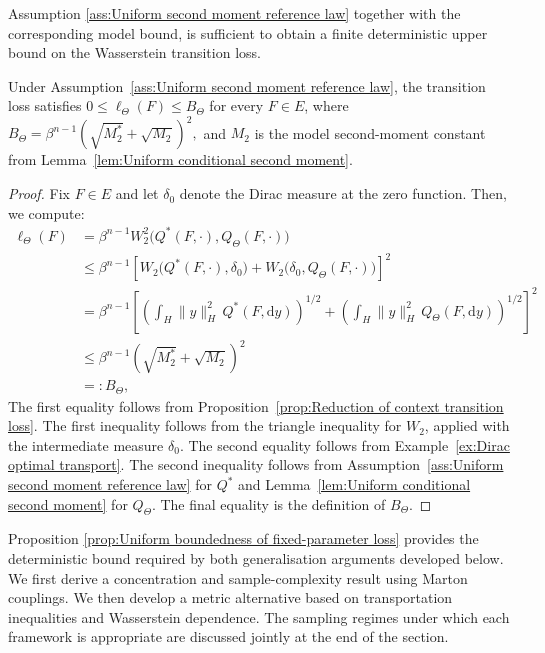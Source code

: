 Assumption \ref{ass:Uniform second moment reference law} together with the corresponding model bound, is sufficient to obtain a finite deterministic upper bound on the Wasserstein transition loss.

\begin{proposition}
\label{prop:Uniform boundedness of fixed-parameter loss}
Under Assumption~\ref{ass:Uniform second moment reference law}, the transition loss satisfies \(0\leqslant\ell_\Theta(F)\leqslant B_\Theta\) for every \(F\in E\), where
\(
B_\Theta
=
\beta^{n-1}
\left(
\sqrt{M_2^*}+\sqrt{M_2}
\right)^2,
\)
and \(M_2\) is the model second-moment constant from Lemma~\ref{lem:Uniform conditional second moment}.
\end{proposition}

\begin{proof}
Fix \(F\in E\) and let \(\delta_0\) denote the Dirac measure at the zero function. Then, we compute:
\[
\begin{aligned}
\ell_\Theta(F)
&=
\beta^{n-1}
W_2^2
\bigl(
Q^*(F,\cdot),
Q_\Theta(F,\cdot)
\bigr)
\\
&\leqslant
\beta^{n-1}
\left[
W_2
\bigl(
Q^*(F,\cdot),
\delta_0
\bigr)
+
W_2
\bigl(
\delta_0,
Q_\Theta(F,\cdot)
\bigr)
\right]^2
\\
&=
\beta^{n-1}
\left[
\left(
\int_H \|y\|_H^2\,Q^*(F,\mathrm dy)
\right)^{1/2}
+
\left(
\int_H \|y\|_H^2\,Q_\Theta(F,\mathrm dy)
\right)^{1/2}
\right]^2
\\
&\leqslant
\beta^{n-1}
\left(
\sqrt{M_2^*}+\sqrt{M_2}
\right)^2
\\
&=:
B_\Theta,
\end{aligned}
\]
The first equality follows from Proposition~\ref{prop:Reduction of context transition loss}. The first inequality follows from the triangle inequality for \(W_2\), applied with the intermediate measure \(\delta_0\). The second equality follows from Example~\ref{ex:Dirac optimal transport}. The second inequality follows from Assumption~\ref{ass:Uniform second moment reference law} for \(Q^*\) and Lemma~\ref{lem:Uniform conditional second moment} for \(Q_\Theta\). The final equality is the definition of \(B_\Theta\).
\end{proof}

Proposition \ref{prop:Uniform boundedness of fixed-parameter loss} provides the deterministic bound required by both generalisation arguments developed below. We first derive a concentration and sample-complexity result using Marton couplings. We then develop a metric alternative based on transportation inequalities and Wasserstein dependence. The sampling regimes under which each framework is appropriate are discussed jointly at the end of the section.

